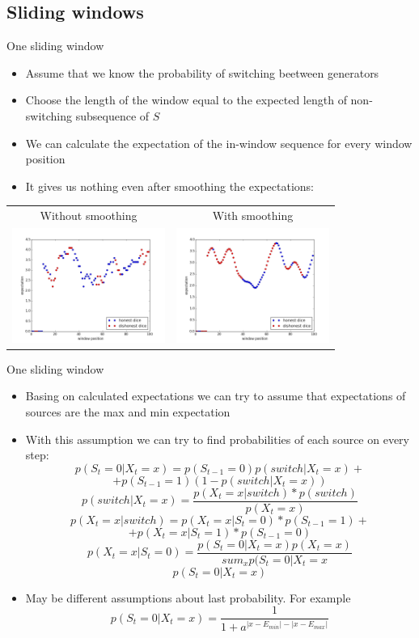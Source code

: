 \documentclass[hyperref=unicode,graphics=pdflatex,13pt]{beamer}
\begin{document}
\subsection{Sliding windows}
\begin{frame}{One sliding window}
\begin{itemize}
   \item Assume that we know the probability of switching beetween generators
   \item Choose the length of the window equal to the expected length of non-switching subsequence of $S$
   \item We can calculate the expectation of the in-window sequence for every window position
   \item It gives us nothing even after smoothing the expectations:
   \end{itemize}
   \begin{tabular}{cc}
      Without smoothing & With smoothing \\
      \includegraphics[width=5cm]{window_expectations.png} &
      \includegraphics[width=5cm]{window_expectations_smoothed.png}
   \end{tabular}


\end{frame}

\begin{frame}{One sliding window}
\begin{itemize}
   \item Basing on calculated expectations we can try to assume that expectations of sources are the max and min expectation
   \item With this assumption we can try to find probabilities of each source on every step:
   \footnotesize$$p(S_t = 0 | X_t = x) = p(S_{t - 1} = 0) p(switch | X_t = x) +$$
   $$+p(S_{t - 1} = 1) (1 - p(switch | X_t = x))$$
   $$p(switch | X_t = x) = \frac{p(X_t = x| switch) * p(switch)}{p(X_t = x)}$$
   \footnotesize$$p(X_t = x| switch) = p(X_t = x | S_t = 0) * p(S_{t - 1} = 1) + $$
   $$+p(X_t = x | S_t = 1) * p(S_{t - 1} = 0)$$
   $$p(X_t = x | S_t = 0) = \frac{p(S_t = 0 | X_t = x)p(X_t = x)}{sum_{x} p(S_t = 0 | X_t = x}$$
   $$p(S_t = 0 | X_t = x)$$
   \item May be different assumptions about last probability. For example $$p(S_t = 0 | X_t = x) = \frac{1}{1 + a^{|x - E_{min}| - |x - E_{max}|}}$$
\end{itemize}
\end{frame}
\end{document}
